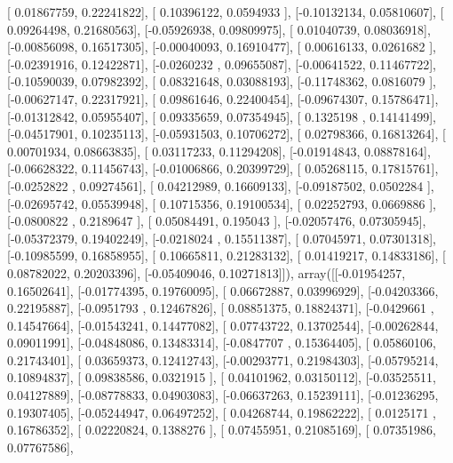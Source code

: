 \documentclass{article}
\begin{document}
       [ 0.01867759,  0.22241822],
       [ 0.10396122,  0.0594933 ],
       [-0.10132134,  0.05810607],
       [ 0.09264498,  0.21680563],
       [-0.05926938,  0.09809975],
       [ 0.01040739,  0.08036918],
       [-0.00856098,  0.16517305],
       [-0.00040093,  0.16910477],
       [ 0.00616133,  0.0261682 ],
       [-0.02391916,  0.12422871],
       [-0.0260232 ,  0.09655087],
       [-0.00641522,  0.11467722],
       [-0.10590039,  0.07982392],
       [ 0.08321648,  0.03088193],
       [-0.11748362,  0.0816079 ],
       [-0.00627147,  0.22317921],
       [ 0.09861646,  0.22400454],
       [-0.09674307,  0.15786471],
       [-0.01312842,  0.05955407],
       [ 0.09335659,  0.07354945],
       [ 0.1325198 ,  0.14141499],
       [-0.04517901,  0.10235113],
       [-0.05931503,  0.10706272],
       [ 0.02798366,  0.16813264],
       [ 0.00701934,  0.08663835],
       [ 0.03117233,  0.11294208],
       [-0.01914843,  0.08878164],
       [-0.06628322,  0.11456743],
       [-0.01006866,  0.20399729],
       [ 0.05268115,  0.17815761],
       [-0.0252822 ,  0.09274561],
       [ 0.04212989,  0.16609133],
       [-0.09187502,  0.0502284 ],
       [-0.02695742,  0.05539948],
       [ 0.10715356,  0.19100534],
       [ 0.02252793,  0.0669886 ],
       [-0.0800822 ,  0.2189647 ],
       [ 0.05084491,  0.195043  ],
       [-0.02057476,  0.07305945],
       [-0.05372379,  0.19402249],
       [-0.0218024 ,  0.15511387],
       [ 0.07045971,  0.07301318],
       [-0.10985599,  0.16858955],
       [ 0.10665811,  0.21283132],
       [ 0.01419217,  0.14833186],
       [ 0.08782022,  0.20203396],
       [-0.05409046,  0.10271813]]), array([[-0.01954257,  0.16502641],
       [-0.01774395,  0.19760095],
       [ 0.06672887,  0.03996929],
       [-0.04203366,  0.22195887],
       [-0.0951793 ,  0.12467826],
       [ 0.08851375,  0.18824371],
       [-0.0429661 ,  0.14547664],
       [-0.01543241,  0.14477082],
       [ 0.07743722,  0.13702544],
       [-0.00262844,  0.09011991],
       [-0.04848086,  0.13483314],
       [-0.0847707 ,  0.15364405],
       [ 0.05860106,  0.21743401],
       [ 0.03659373,  0.12412743],
       [-0.00293771,  0.21984303],
       [-0.05795214,  0.10894837],
       [ 0.09838586,  0.0321915 ],
       [ 0.04101962,  0.03150112],
       [-0.03525511,  0.04127889],
       [-0.08778833,  0.04903083],
       [-0.06637263,  0.15239111],
       [-0.01236295,  0.19307405],
       [-0.05244947,  0.06497252],
       [ 0.04268744,  0.19862222],
       [ 0.0125171 ,  0.16786352],
       [ 0.02220824,  0.1388276 ],
       [ 0.07455951,  0.21085169],
       [ 0.07351986,  0.07767586],
\end{document}
